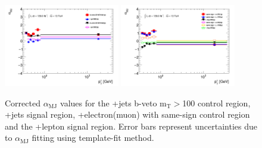 	\begin{figure}[h!]
	\begin{center}
	\includegraphics[width=0.45\textwidth]{chapters/chapter6_HPlus/images/FFs/ALPHA_inclusive__taujet.png} \qquad
	\includegraphics[width=0.45\textwidth]{chapters/chapter6_HPlus/images/FFs/ALPHA_inclusive__taulep.png} 
	\end{center}
	\caption{
	Corrected $\alpha_\mathrm{MJ}$ values for the \tauhad+jets b-veto $\mathrm{m_{T}}>$100 control region, \tauhad+jets signal region, \tauhad+electron(muon) with same-sign control region and the \tauhad+lepton signal region. Error bars represent uncertainties due to $\alpha_\mathrm{MJ}$ fitting using template-fit method. 
	}
	\label{fig:rQCD}
	\end{figure}


